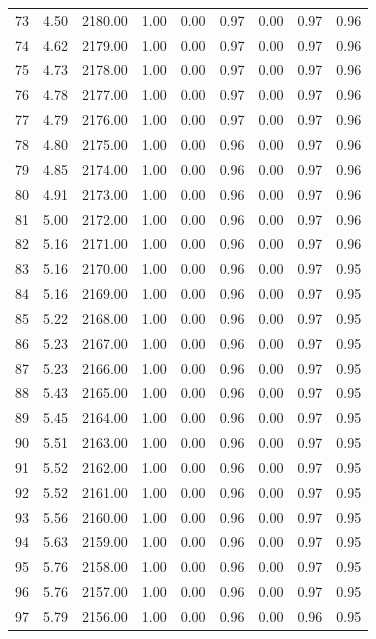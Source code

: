 \documentclass{article}\usepackage[]{graphicx}\usepackage[]{color}
\begin{document}
\begin{longtable}{rrrrrrrrr}
  73 & 4.50 & 2180.00 & 1.00 & 0.00 & 0.97 & 0.00 & 0.97 & 0.96 \\ 
  74 & 4.62 & 2179.00 & 1.00 & 0.00 & 0.97 & 0.00 & 0.97 & 0.96 \\ 
  75 & 4.73 & 2178.00 & 1.00 & 0.00 & 0.97 & 0.00 & 0.97 & 0.96 \\ 
  76 & 4.78 & 2177.00 & 1.00 & 0.00 & 0.97 & 0.00 & 0.97 & 0.96 \\ 
  77 & 4.79 & 2176.00 & 1.00 & 0.00 & 0.97 & 0.00 & 0.97 & 0.96 \\ 
  78 & 4.80 & 2175.00 & 1.00 & 0.00 & 0.96 & 0.00 & 0.97 & 0.96 \\ 
  79 & 4.85 & 2174.00 & 1.00 & 0.00 & 0.96 & 0.00 & 0.97 & 0.96 \\ 
  80 & 4.91 & 2173.00 & 1.00 & 0.00 & 0.96 & 0.00 & 0.97 & 0.96 \\ 
  81 & 5.00 & 2172.00 & 1.00 & 0.00 & 0.96 & 0.00 & 0.97 & 0.96 \\ 
  82 & 5.16 & 2171.00 & 1.00 & 0.00 & 0.96 & 0.00 & 0.97 & 0.96 \\ 
  83 & 5.16 & 2170.00 & 1.00 & 0.00 & 0.96 & 0.00 & 0.97 & 0.95 \\ 
  84 & 5.16 & 2169.00 & 1.00 & 0.00 & 0.96 & 0.00 & 0.97 & 0.95 \\ 
  85 & 5.22 & 2168.00 & 1.00 & 0.00 & 0.96 & 0.00 & 0.97 & 0.95 \\ 
  86 & 5.23 & 2167.00 & 1.00 & 0.00 & 0.96 & 0.00 & 0.97 & 0.95 \\ 
  87 & 5.23 & 2166.00 & 1.00 & 0.00 & 0.96 & 0.00 & 0.97 & 0.95 \\ 
  88 & 5.43 & 2165.00 & 1.00 & 0.00 & 0.96 & 0.00 & 0.97 & 0.95 \\ 
  89 & 5.45 & 2164.00 & 1.00 & 0.00 & 0.96 & 0.00 & 0.97 & 0.95 \\ 
  90 & 5.51 & 2163.00 & 1.00 & 0.00 & 0.96 & 0.00 & 0.97 & 0.95 \\ 
  91 & 5.52 & 2162.00 & 1.00 & 0.00 & 0.96 & 0.00 & 0.97 & 0.95 \\ 
  92 & 5.52 & 2161.00 & 1.00 & 0.00 & 0.96 & 0.00 & 0.97 & 0.95 \\ 
  93 & 5.56 & 2160.00 & 1.00 & 0.00 & 0.96 & 0.00 & 0.97 & 0.95 \\ 
  94 & 5.63 & 2159.00 & 1.00 & 0.00 & 0.96 & 0.00 & 0.97 & 0.95 \\ 
  95 & 5.76 & 2158.00 & 1.00 & 0.00 & 0.96 & 0.00 & 0.97 & 0.95 \\ 
  96 & 5.76 & 2157.00 & 1.00 & 0.00 & 0.96 & 0.00 & 0.97 & 0.95 \\ 
  97 & 5.79 & 2156.00 & 1.00 & 0.00 & 0.96 & 0.00 & 0.96 & 0.95 \\ 

\end{longtable}
\end{document}
